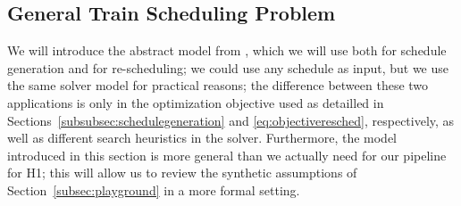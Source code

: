 \documentclass{article}
\begin{document}
\subsection{General Train Scheduling Problem}\label{subsubsec:scheduleproblemdescription}



We will introduce the abstract model from \cite{DBLP:journals/corr/abs-2003-08598}, which we will use both for schedule generation and for re-scheduling; we could use any schedule as input, but we use the same solver model for practical reasons; the difference between these two applications is only in the optimization objective used as detailled in Sections~\ref{subsubsec:schedulegeneration} and \ref{eq:objectiveresched}, respectively, as well as different search heuristics in the solver.
Furthermore, the model introduced in this section is more general than we actually need for our pipeline for H1; this will allow us to review the synthetic assumptions of Section~\ref{subsec:playground} in a more formal setting.
\end{document}
